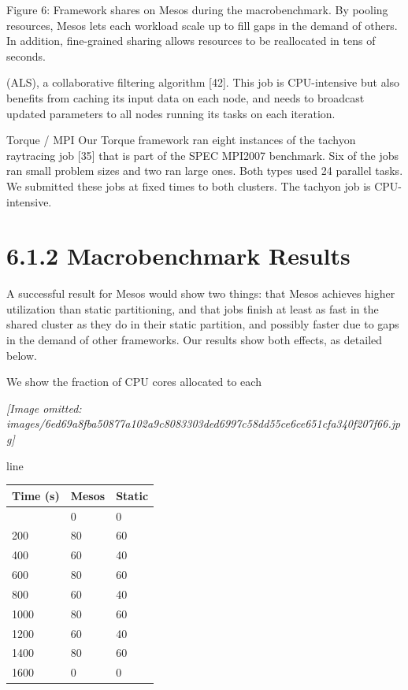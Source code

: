 \documentclass[
]{article}
\newcounter{none} %
\begin{document}
Figure 6: Framework shares on Mesos during the macrobenchmark. By
pooling resources, Mesos lets each workload scale up to fill gaps in the
demand of others. In addition, fine-grained sharing allows resources to
be reallocated in tens of seconds.

(ALS), a collaborative filtering algorithm {[}42{]}. This job is
CPU-intensive but also benefits from caching its input data on each
node, and needs to broadcast updated parameters to all nodes running its
tasks on each iteration.

Torque / MPI Our Torque framework ran eight instances of the tachyon
raytracing job {[}35{]} that is part of the SPEC MPI2007 benchmark. Six
of the jobs ran small problem sizes and two ran large ones. Both types
used 24 parallel tasks. We submitted these jobs at fixed times to both
clusters. The tachyon job is CPU-intensive.

\section{6.1.2 Macrobenchmark Results}\label{macrobenchmark-results}

A successful result for Mesos would show two things: that Mesos achieves
higher utilization than static partitioning, and that jobs finish at
least as fast in the shared cluster as they do in their static
partition, and possibly faster due to gaps in the demand of other
frameworks. Our results show both effects, as detailed below.

We show the fraction of CPU cores allocated to each

\textit{[Image omitted: images/6ed69a8fba50877a102a9c8083303ded6997c58dd55ce6ce651cfa340f207f66.jpg]}

line

{\def\LTcaptype{none} %
\begin{longtable}[]{@{}lll@{}}
\toprule\noalign{}
Time (s) & Mesos & Static \\
\midrule\noalign{}
\endhead
\bottomrule\noalign{}
\endlastfoot
0 & 0 & 0 \\
200 & 80 & 60 \\
400 & 60 & 40 \\
600 & 80 & 60 \\
800 & 60 & 40 \\
1000 & 80 & 60 \\
1200 & 60 & 40 \\
1400 & 80 & 60 \\
1600 & 0 & 0 \\
\end{longtable}
}
\end{document}
